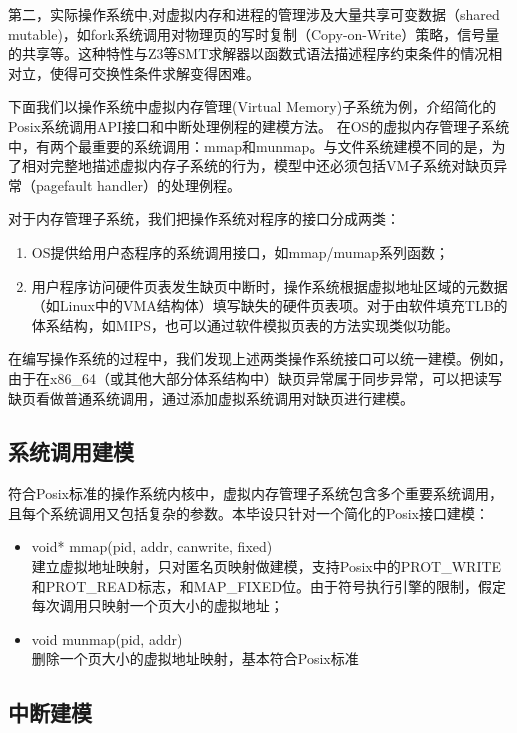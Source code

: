 第二，实际操作系统中,对虚拟内存和进程的管理涉及大量共享可变数据（shared
mutable)，如fork系统调用对物理页的写时复制（Copy-on-Write）策略，信号量的共享等。这种特性与Z3等SMT求解器以函数式语法描述程序约束条件的情况相对立，使得可交换性条件求解变得困难。

下面我们以操作系统中虚拟内存管理(Virtual Memory)子系统为例，介绍简化的Posix系统调用API接口和中断处理例程的建模方法。
在OS的虚拟内存管理子系统中，有两个最重要的系统调用：mmap和munmap。与文件系统建模不同的是，为了相对完整地描述虚拟内存子系统的行为，模型中还必须包括VM子系统对缺页异常（pagefault
handler）的处理例程。

对于内存管理子系统，我们把操作系统对程序的接口分成两类：
\begin{enumerate}
\item OS提供给用户态程序的系统调用接口，如mmap/mumap系列函数；
\item 用户程序访问硬件页表发生缺页中断时，操作系统根据虚拟地址区域的元数据（如Linux中的VMA结构体）填写缺失的硬件页表项。对于由软件填充TLB的体系结构，如MIPS，也可以通过软件模拟页表的方法实现类似功能。
\end{enumerate}

在编写操作系统的过程中，我们发现上述两类操作系统接口可以统一建模。例如，由于在x86\_64（或其他大部分体系结构中）缺页异常属于同步异常\cite{intelsys}，可以把读写缺页看做普通系统调用，通过添加虚拟系统调用对缺页进行建模。

\subsection{系统调用建模}
符合Posix标准的操作系统内核中，虚拟内存管理子系统包含多个重要系统调用，且每个系统调用又包括复杂的参数。本毕设只针对一个简化的Posix接口建模：

\begin{itemize}
	\item void* mmap(pid, addr, canwrite, fixed) \\
		建立虚拟地址映射，只对匿名页映射做建模，支持Posix中的PROT\_WRITE和PROT\_READ标志，和MAP\_FIXED位。由于符号执行引擎的限制，假定每次调用只映射一个页大小的虚拟地址；
	\item void munmap(pid, addr) \\
		删除一个页大小的虚拟地址映射，基本符合Posix标准
\end{itemize}

\subsection{中断建模}

